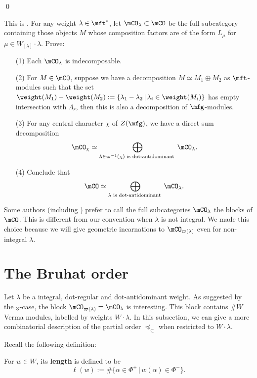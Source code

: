 	\qed

	\begin{exe}
		This is . For any weight $\lambda\in \mft^*$, let $\mCO_\lambda \subset \mCO$ be the full subcategory containing those objects $M$ whose composition factors are of the form $L_\mu$ for $\mu \in W_{[\lambda]}\cdot \lambda$. Prove:
		\begin{itemize}
			\item[(1)]
				Each $\mCO_\lambda$ is indecomposable.
			\item[(2)] 
				For $M\in \mCO$, suppose we have a decomposition $M\simeq M_1\oplus M_2$ as $\mft$-modules such that the set $\weight(M_1)-\weight(M_2):=\{ \lambda_1-\lambda_2\,\vert\, \lambda_i\in \weight(M_i) \}$ has empty intersection with $\Lambda_r$, then this is also a decomposition of $\mfg$-modules.
			\item[(3)]
				For any central character $\chi$ of $Z(\mfg)$, we have a direct sum decomposition
				\[
					\mCO_\chi \simeq \bigoplus_{\lambda\in \varpi^{-1}(\chi) \textrm{ is dot-antidominant }} \mCO_\lambda.
				\]
			\item[(4)]
				Conclude that 
				\[
					\mCO \simeq \bigoplus_{\lambda\textrm{ is dot-antidominant }} \mCO_\lambda.
				\]
		\end{itemize}
	\end{exe}

	\begin{rem}
		Some authors (including \cite{H}) prefer to call the full subcategories $\mCO_\lambda$ the blocks of $\mCO$. This is different from our convention when $\lambda$ is not integral. We made this choice because we will give geometric incarnations to $\mCO_{\varpi(\lambda)}$ even for non-integral $\lambda$.
	\end{rem}

	\section{The Bruhat order}

	Let $\lambda$ be a integral, dot-regular and dot-antidominant weight. As suggested by the $\sl_3$-case, the block $\mCO_{\varpi(\lambda)}=\mCO_\lambda$ is interesting. This block contains $\# W$ Verma modules, labelled by weights $W\cdot \lambda$. In this subsection, we can give a more combinatorial description of the partial order $\preceq_\subset$ when restricted to $W\cdot \lambda$. 

	Recall the following definition:
	\begin{defn}
		For $w\in W$, its \textbf{length} is defined to be
		\[
			\ell(w):= \# \{ \alpha\in \Phi^+\,\vert\, w(\alpha)\in \Phi^-\}.
		\]
	\end{defn}

